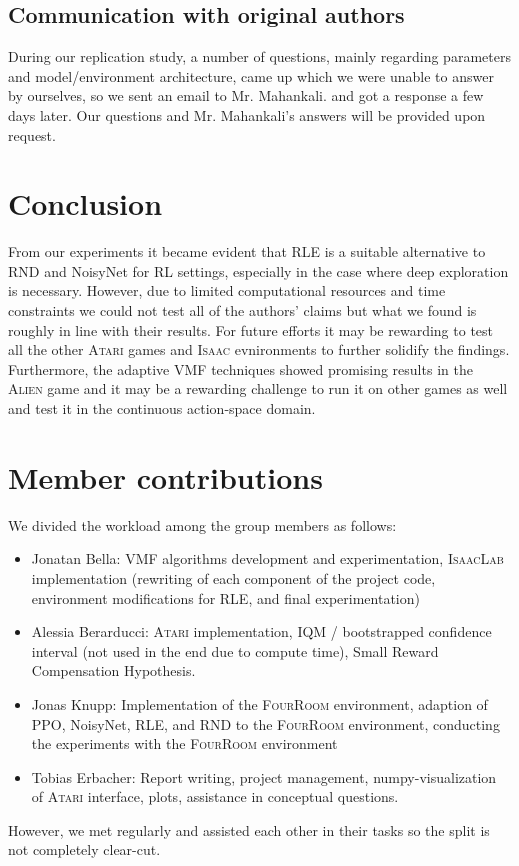 \documentclass[10pt]{article} %
\begin{document}
\subsection{Communication with original authors}

\noindent During our replication study, a number of questions, mainly regarding parameters and model/environment architecture, came up which we were unable to answer by ourselves, so we sent an email to Mr. Mahankali. and got a response a few days later. Our questions and Mr. Mahankali's answers will be provided upon request. 

\section{Conclusion}

\noindent From our experiments it became evident that RLE is a suitable alternative to RND and NoisyNet for RL settings, especially in the case where deep exploration is necessary. However, due to limited computational resources and time constraints we could not test all of the authors' claims but what we found is roughly in line with their results. For future efforts it may be rewarding to test all the other \textsc{Atari} games and \textsc{Isaac} evnironments to further solidify the findings. Furthermore, the adaptive VMF techniques showed promising results in the \textsc{Alien} game and it may be a rewarding challenge to run it on other games as well and test it in the continuous action-space domain.

\clearpage
\section*{Member contributions}

\noindent We divided the workload among the group members as follows:

\begin{itemize}
  \item Jonatan Bella: VMF algorithms development and experimentation, \textsc{IsaacLab} implementation (rewriting of each component of the project code, environment modifications for RLE, and final experimentation)
  \item Alessia Berarducci: \textsc{Atari} implementation, IQM / bootstrapped confidence interval (not used in the end due to compute time), Small Reward Compensation Hypothesis.
  \item Jonas Knupp: Implementation of the \textsc{FourRoom} environment, adaption of PPO, NoisyNet, RLE, and RND to the \textsc{FourRoom} environment, conducting the experiments with the \textsc{FourRoom} environment
  \item Tobias Erbacher: Report writing, project management, numpy-visualization of \textsc{Atari} interface, plots, assistance in conceptual questions.
\end{itemize}

\noindent However, we met regularly and assisted each other in their tasks so the split is not completely clear-cut.






\end{document}
